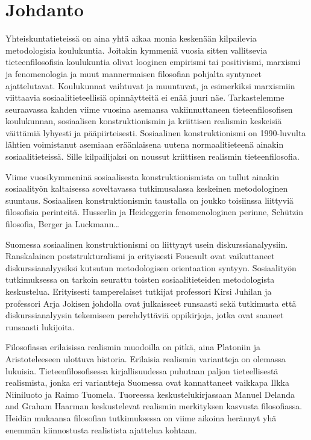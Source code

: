 \section*{Johdanto}

Yhteiskuntatieteissä on aina yhtä aikaa monia keskenään kilpailevia
metodologisia koulukuntia. Joitakin kymmeniä vuosia sitten vallitsevia
tieteenfilosofisia koulukuntia olivat looginen empirismi tai
positivismi, marxismi ja fenomenologia ja muut mannermaisen filosofian
pohjalta syntyneet ajattelutavat. Koulukunnat vaihtuvat ja muuntuvat, ja
esimerkiksi marxismiin viittaavia sosiaalitieteellisiä opinnäytteitä ei
enää juuri näe. Tarkastelemme seuraavassa kahden viime vuosina asemansa
vakiinnuttaneen tieteenfilosofisen koulukunnan, sosiaalisen
konstruktionismin ja kriittisen realismin keskeisiä väittämiä lyhyesti
ja pääpiirteisesti. Sosiaalinen konstruktionismi on 1990-luvulta lähtien
voimistanut asemiaan eräänlaisena uutena normaalitieteenä ainakin
sosiaalitieteissä. Sille kilpailijaksi on noussut kriittisen realismin
tieteenfilosofia.

Viime vuosikymmeninä sosiaalisesta konstruktionismista on tullut ainakin
sosiaalityön kaltaisessa soveltavassa tutkimusalassa keskeinen
metodologinen suuntaus. Sosiaalisen konstruktionismin taustalla on
joukko toisiinssa liittyviä filosofisia perinteitä. Husserlin ja
Heideggerin fenomenologinen perinne, Schützin filosofia, Berger ja
Luckmann\ldots{}

Suomessa sosiaalinen konstruktionismi on liittynyt usein
diskurssianalyysiin. Ranskalainen poststrukturalismi ja erityisesti
Foucault ovat vaikuttaneet diskurssianalyysiksi kutsutun metodologisen
orientaation syntyyn. Sosiaalityön tutkimuksessa on tarkoin seurattu
toisten sosiaalitieteiden metodologista keskustelua. Erityisesti
tamperelaiset tutkijat professori Kirsi Juhilan ja professori Arja
Jokisen johdolla ovat julkaisseet runsaasti sekä tutkimusta että
diskurssianalyysin tekemiseen perehdyttäviä oppikirjoja, jotka ovat
saaneet runsaasti lukijoita.

Filosofiassa erilaisissa realismin muodoilla on pitkä, aina Platoniin ja
Aristoteleeseen ulottuva historia. Erilaisia realismin variantteja on
olemassa lukuisia. Tieteenfilosofisessa kirjallisuudessa puhutaan paljon
tieteellisestä realismista, jonka eri variantteja Suomessa ovat
kannattaneet vaikkapa Ilkka Niiniluoto ja Raimo Tuomela. Tuoreessa
keskustelukirjassaan Manuel Delanda and Graham Haarman
\citep{Delanda_Harman_2017} keskustelevat realismin merkityksen kasvusta
filosofiassa. Heidän mukaansa filosofian tutkimuksessa on viime aikoina
herännyt yhä enemmän kiinnostusta realistista ajattelua kohtaan.

